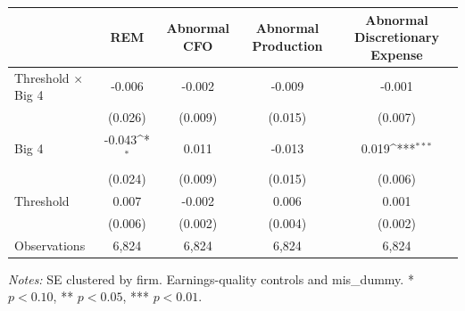 \documentclass[10pt]{article}
\newcommand{\sym}[1]{\textsuperscript{#1}}
\begin{document}
\begin{minipage}{19cm}\fontsize{10}{12}\selectfont\setlength{\tabcolsep}{4pt}\renewcommand{\arraystretch}{1.15}


\def\sym#1{\ifmmode^{#1}\else\(^{#1}\)\fi}
\centering
{}
\label{tab:big4-roe-threshold-rem-components}
\begin{threeparttable}
\begin{tabular}{l c c c c }
\toprule
 & REM & Abnormal CFO & Abnormal Production & Abnormal Discretionary Expense \\
\midrule
Threshold $\times$ Big 4 & -0.006 & -0.002 & -0.009 & -0.001 \\
 & (0.026) & (0.009) & (0.015) & (0.007) \\
Big 4 & -0.043\sym{*} & 0.011 & -0.013 & 0.019\sym{***} \\
 & (0.024) & (0.009) & (0.015) & (0.006) \\
Threshold & 0.007 & -0.002 & 0.006 & 0.001 \\
 & (0.006) & (0.002) & (0.004) & (0.002) \\
Observations & 6,824 & 6,824 & 6,824 & 6,824 \\
\bottomrule
\end{tabular}
\begin{tablenotes}\fontsize{9}{11}\selectfont
\item \raggedright \fontsize{9}{11}\selectfont \textit{Notes:} SE clustered by firm. Earnings-quality controls and mis\_dummy. * $p<0.10$, ** $p<0.05$, *** $p<0.01$.
\end{tablenotes}
\end{threeparttable}

\end{minipage}
\end{document}
